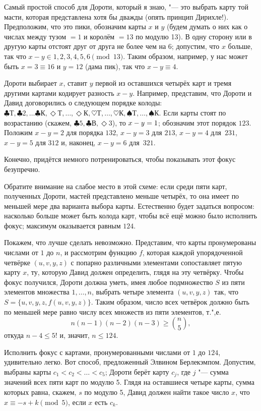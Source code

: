\documentclass[twoside]{book}
\begin{document}
Самый простой способ для Дороти, который я знаю, "--- это выбрать карту той масти, которая представлена хотя бы дважды (опять принцип Дирихле!).
Предположим, что это пики, обозначим карты $x$ и $y$ (будем думать о них как о числах между тузом $=1$ и королём $=13$ по модулю 13).
В одну сторону или в другую карты отстоят друг от друга не более чем на 6;
допустим, что $x$ больше, так что $x-y\in {1,2,3,4,5,6} \pmod{13}$.
Таким образом, например, у нас может быть $x =3\equiv 16$ и $y = 12$ (дама пик), так что $x-y\equiv4$.

Дороти выбирает $x$, ставит $y$ первой из оставшихся четырёх карт и тремя другими картами кодирует разность $x-y$.
Например, представим, что Дороти и Давид договорились о следующем порядке колоды: 
$\clubsuit\text{Т},
\clubsuit 2,
\dots
\clubsuit\text{К},
\Diamond\text{Т},
\dots,
\Diamond\text{К},
\heartsuit\text{Т},
\dots,
\heartsuit\text{К},
\spadesuit \text{Т},
\dots,
\spadesuit \text{К}$.
Если карты стоят по возрастанию (скажем, 
$\clubsuit 5,
\clubsuit \text{В},
\Diamond 3$), то $x-y\z=1$; обозначим этот порядок $123$.
Положим $x-y=2$ для порядка $132$,
$x-y=3$ для $213$, $x-y=4$ для~$231$, $x-y=5$ для $312$ и, наконец, $x-y=6$ для~$321$.

Конечно, придётся немного потренироваться, чтобы показывать этот фокус безупречно.

\medskip

Обратите внимание на слабое место в этой схеме: если среди пяти карт, полученных Дороти, мастей представлено меньше четырёх, то она имеет по меньшей мере два варианта выбора карты.
Естественно будет задаться вопросом: насколько больше может быть колода карт, чтобы всё ещё можно было исполнить фокус;
максимум оказывается равным $124$.

Покажем, что лучше сделать невозможно.  Представим, что карты
пронумерованы числами от $1$ до $n$, и
рассмотрим функцию $f$, которая каждой упорядоченной четвёрке
$(u,v,y,z)$ с попарно различными элементами сопоставляет пятую карту
$x$, ту, которую Давид должен определить, глядя на эту четвёрку.
Чтобы фокус получился, Дороти должна уметь, имея любое
подмножество $S$ из пяти элементов множества
${1, \dots, n}$, выбрать четыре элемента $(u,v,y,z)$ так, что
$S = \{u,v,y,z, f(u,v,y,z)\}$.  Таким образом, число всех четвёрок
должно быть по меньшей мере равно числу всех
множеств из пяти элементов, т.",е.
\[n(n - 1)(n - 2)(n - 3)\ge \binom n5,\]
откуда $n - 4 \le5!$ и, значит, $n\le 124$.


Исполнить фокус с картами, пронумерованными числами от $1$
до $124$, удивительно легко.  Вот способ, предложенный Элвином
Берлекэмпом.
Допустим, выбраны карты $c_1 < c_2 < \ldots < c_5$;
Дороти берёт карту $c_j$, где $j$ "--- сумма значений всех пяти карт
по модулю 5.
Глядя на оставшиеся четыре карты, сумма которых равна, скажем, $s$ по модулю 5, Давид должен найти такое число
$x$, что $x\equiv -s + k \pmod 5$, если $x$ есть
$c_k$.
\end{document}
